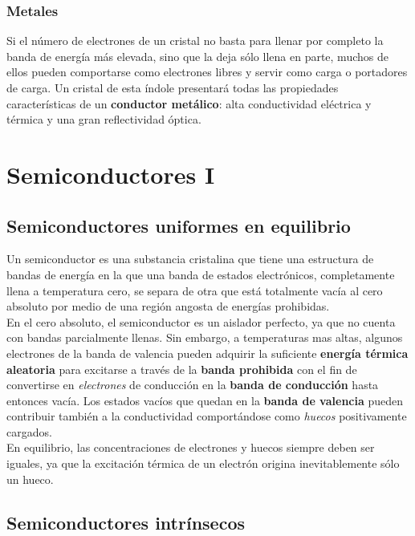 \documentclass[oneside]{book}
\numberwithin{equation}{section}
\numberwithin{figure}{section}
\numberwithin{table}{section}
\begin{document}
			\subsection{Metales}
	
				Si el número de electrones de un cristal no basta para llenar por completo la banda de energía más elevada, sino que la deja sólo llena en parte, muchos de ellos pueden comportarse como electrones libres y servir como carga o portadores de carga. Un cristal de esta índole presentará todas las propiedades características de un \textbf{conductor metálico}: alta conductividad eléctrica y térmica y una gran reflectividad óptica.	
	
	\chapter{Semiconductores I}
		
		\section{Semiconductores uniformes en equilibrio}
		
		Un semiconductor es una substancia cristalina que tiene una estructura de bandas de energía en la que una banda de estados electrónicos, completamente llena a temperatura cero, se separa de otra que está totalmente vacía al cero absoluto por medio de una región angosta de energías prohibidas.\\
		
		En el cero absoluto, el semiconductor es un aislador perfecto, ya que no cuenta con bandas parcialmente llenas. Sin embargo, a temperaturas mas altas, algunos electrones de la banda de valencia pueden adquirir la suficiente \textbf{energía térmica aleatoria} para excitarse a través de la \textbf{banda prohibida} con el fin de convertirse en \textit{electrones} de conducción en la \textbf{banda de conducción} hasta entonces vacía. Los estados vacíos que quedan en la \textbf{banda de valencia} pueden contribuir también a la conductividad comportándose como \textit{huecos} positivamente cargados.\\
		
		En equilibrio, las concentraciones de electrones y huecos siempre deben ser iguales, ya que la excitación térmica de un electrón origina inevitablemente sólo un hueco.\\
		
		\section{Semiconductores intrínsecos}
		
\end{document}
